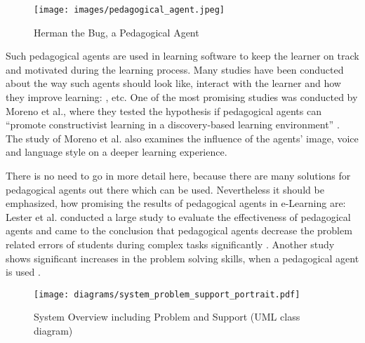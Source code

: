 \begin{figure}[t]
    \centering
    \texttt{[image: images/pedagogical\_agent.jpeg]}
    \caption[Herman the Bug, a Pedagogical Agent]
    {Herman the Bug, a Pedagogical Agent \cite{Lester1997c}}
    \label{herman_the_bug}
\end{figure}

Such pedagogical agents are used in learning software to keep the learner on track and
motivated during the learning process. Many studies have been conducted about
the way such agents should look like, interact with the learner and how they
improve learning: \cite{Nunes2002b, Conati2004b, Johnson2000, Slater2000a,
Baylor2003b, Blanchard2004b, Voerman1997a}, etc. One of the
most promising studies was conducted by Moreno et al., where they tested the
hypothesis if pedagogical agents can ``promote constructivist learning in a
discovery-based learning environment'' \cite{Moreno2000a}. The study of Moreno
et al. \cite{Moreno2000a} also examines the influence of the agents' image,
voice and language style on a deeper learning experience.

There is no need to go in more detail here, because there are many solutions for
pedagogical agents out there which can be used. Nevertheless it should be emphasized,
how promising the results of pedagogical agents in e-Learning are:
Lester et al. conducted a large study to evaluate the effectiveness of
pedagogical agents and came to the conclusion that pedagogical agents decrease
the problem related errors of students during complex tasks significantly
\cite{Lester1997a}. Another study shows significant increases in the problem
solving skills, when a pedagogical agent is used \cite{Lester1997c}.

\begin{figure}
    \centering
    \texttt{[image: diagrams/system\_problem\_support\_portrait.pdf]}
    \caption[System Overview including Problem and Support (UML class diagram)]
    {System Overview including Problem and Support (UML class diagram)}
    \label{system_problem_support}
\end{figure}
